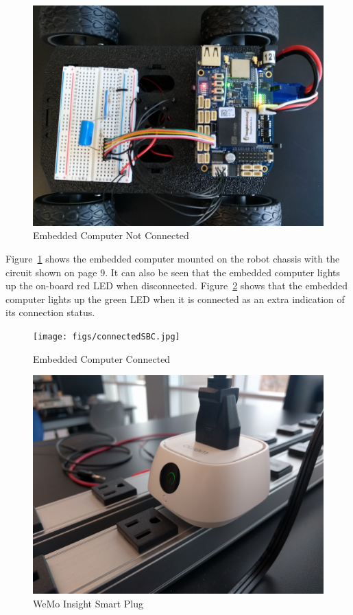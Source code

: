 \begin{figure}[H]
    \centering
    \includegraphics[scale=0.1]{figs/notConnectedSBC.jpg}
    \caption{Embedded Computer Not Connected}
    \label{fig:not_connected_bb}
\end{figure}

Figure~\ref{fig:not_connected_bb} shows the embedded computer mounted on the robot chassis with the circuit shown on page 9. It can also be seen that the embedded computer lights up the on-board red LED when disconnected. Figure~\ref{fig:connected_bb} shows that the embedded computer lights up the green LED when it is connected as an extra indication of its connection status.

\begin{figure}[H]
    \centering
    \texttt{[image: figs/connectedSBC.jpg]}
    \caption{Embedded Computer Connected}
    \label{fig:connected_bb}
\end{figure}

\begin{figure}[H]
    \centering
    \includegraphics[scale=0.085]{figs/wemoView.jpg}
    \caption{WeMo Insight Smart Plug}
    \label{fig:wemo}
\end{figure}

